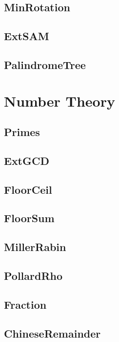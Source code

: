 	\subsection{MinRotation}
	
	\subsection{ExtSAM}
	
	\subsection{PalindromeTree}
	
\section{Number Theory}
	\subsection{Primes}
	
	\subsection{ExtGCD}
	
	\subsection{FloorCeil}
	
	\subsection{FloorSum}
	
	\subsection{MillerRabin}
	
	\subsection{PollardRho}
	
	\subsection{Fraction}
	
	\subsection{ChineseRemainder}
	
